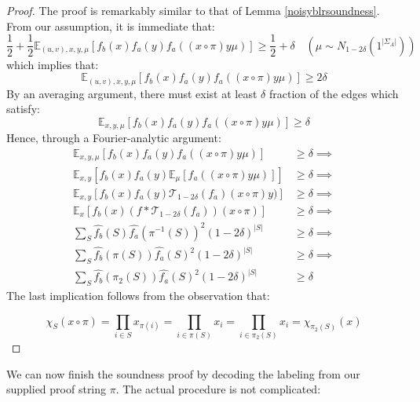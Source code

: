 \begin{proof}
  The proof is remarkably similar to that of Lemma \ref{noisyblrsoundness}. From our assumption, it is immediate that:
  \begin{equation}
    \frac{1}{2} + \frac{1}{2}\mathbb{E}_{(u,v),x,y,\mu}\left[f_b(x)f_a(y)f_a((x \circ \pi)y\mu) \right] \geq \frac{1}{2} + \delta  \quad (\mu \sim N_{1 - 2\delta}(1^{|\Sigma_A|}))
  \end{equation}
  which implies that:
  \begin{equation}
    \mathbb{E}_{(u,v),x,y,\mu}\left[f_b(x)f_a(y)f_a((x \circ \pi)y\mu) \right] \geq 2\delta
  \end{equation}
  By an averaging argument, there must exist at least $\delta$ fraction of the edges which satisfy:
  \begin{equation}
      \mathbb{E}_{x,y,\mu}\left[f_b(x)f_a(y)f_a((x \circ \pi)y\mu) \right] \geq \delta
  \end{equation}
  Hence, through a Fourier-analytic argument:
  \begin{align*}
    \mathbb{E}_{x,y,\mu}\left[f_b(x)f_a(y)f_a((x \circ \pi)y\mu) \right] & \geq \delta \implies \\[0.7ex]
    \mathbb{E}_{x,y}\left[f_b(x)f_a(y) \mathbb{E}_{\mu} \left[f_a((x \circ \pi)y\mu) \right] \right] & \geq \delta \implies \\[0.7ex]
    \mathbb{E}_{x,y}\left[f_b(x)f_a(y) \mathcal{T}_{1-2\delta}(f_a)(x \circ \pi)y) \right] & \geq \delta \implies \\[0.7ex]
    \mathbb{E}_{x}\left[ f_b(x)(f * \mathcal{T}_{1 - 2\delta}(f_a))(x \circ \pi) \right] & \geq \delta \implies \\
    \sum_{S} \widehat{f_b}(S) \widehat{f_a}(\pi^{-1}(S))^2(1 - 2\delta)^{|S|} & \geq \delta  \implies \\
    \sum_{S} \widehat{f_b}(\pi(S))\widehat{f_a}(S)^2 (1 - 2\delta)^{|S|} & \geq \delta \implies \\
    \sum_{S} \widehat{f_b}(\pi_2(S))\widehat{f_a}(S)^2 (1 - 2\delta)^{|S|} & \geq \delta
    \end{align*}
    The last implication follows from the observation that:

    \[ \chi_S(x \circ \pi) = \prod_{i \in S} x_{\pi(i)} = \prod_{i \in \pi(S)} x_i = \prod_{i \in \pi_2(S)} x_i = \chi_{\pi_2(S)}(x) \]
\end{proof}

We can now finish the soundness proof by decoding the labeling from our supplied proof string $\pi$. The actual procedure is not complicated:

